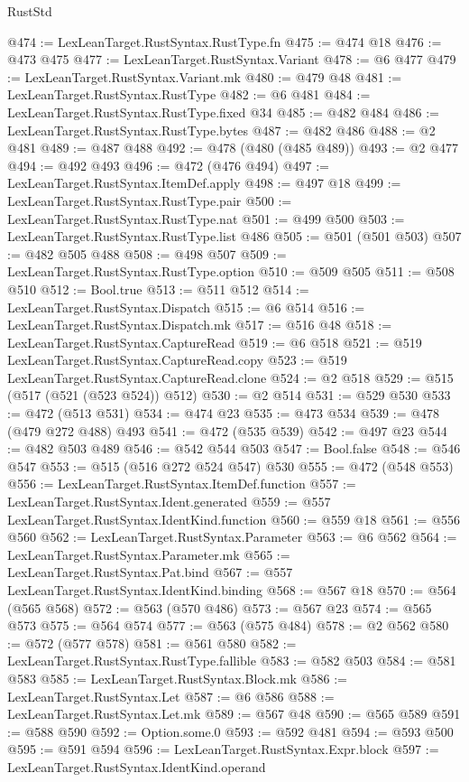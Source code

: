 \begin{lexlean}{RustStd}
\begin{coremodule}
@474 := LexLeanTarget.RustSyntax.RustType.fn
@475 := @474 @18
@476 := @473 @475
@477 := LexLeanTarget.RustSyntax.Variant
@478 := @6 @477
@479 := LexLeanTarget.RustSyntax.Variant.mk
@480 := @479 @48
@481 := LexLeanTarget.RustSyntax.RustType
@482 := @6 @481
@484 := LexLeanTarget.RustSyntax.RustType.fixed @34
@485 := @482 @484
@486 := LexLeanTarget.RustSyntax.RustType.bytes
@487 := @482 @486
@488 := @2 @481
@489 := @487 @488
@492 := @478 (@480 (@485 @489))
@493 := @2 @477
@494 := @492 @493
@496 := @472 (@476 @494)
@497 := LexLeanTarget.RustSyntax.ItemDef.apply
@498 := @497 @18
@499 := LexLeanTarget.RustSyntax.RustType.pair
@500 := LexLeanTarget.RustSyntax.RustType.nat
@501 := @499 @500
@503 := LexLeanTarget.RustSyntax.RustType.list @486
@505 := @501 (@501 @503)
@507 := @482 @505 @488
@508 := @498 @507
@509 := LexLeanTarget.RustSyntax.RustType.option
@510 := @509 @505
@511 := @508 @510
@512 := Bool.true
@513 := @511 @512
@514 := LexLeanTarget.RustSyntax.Dispatch
@515 := @6 @514
@516 := LexLeanTarget.RustSyntax.Dispatch.mk
@517 := @516 @48
@518 := LexLeanTarget.RustSyntax.CaptureRead
@519 := @6 @518
@521 := @519 LexLeanTarget.RustSyntax.CaptureRead.copy
@523 := @519 LexLeanTarget.RustSyntax.CaptureRead.clone
@524 := @2 @518
@529 := @515 (@517 (@521 (@523 @524)) @512)
@530 := @2 @514
@531 := @529 @530
@533 := @472 (@513 @531)
@534 := @474 @23
@535 := @473 @534
@539 := @478 (@479 @272 @488) @493
@541 := @472 (@535 @539)
@542 := @497 @23
@544 := @482 @503 @489
@546 := @542 @544 @503
@547 := Bool.false
@548 := @546 @547
@553 := @515 (@516 @272 @524 @547) @530
@555 := @472 (@548 @553)
@556 := LexLeanTarget.RustSyntax.ItemDef.function
@557 := LexLeanTarget.RustSyntax.Ident.generated
@559 := @557 LexLeanTarget.RustSyntax.IdentKind.function
@560 := @559 @18
@561 := @556 @560
@562 := LexLeanTarget.RustSyntax.Parameter
@563 := @6 @562
@564 := LexLeanTarget.RustSyntax.Parameter.mk
@565 := LexLeanTarget.RustSyntax.Pat.bind
@567 := @557 LexLeanTarget.RustSyntax.IdentKind.binding
@568 := @567 @18
@570 := @564 (@565 @568)
@572 := @563 (@570 @486)
@573 := @567 @23
@574 := @565 @573
@575 := @564 @574
@577 := @563 (@575 @484)
@578 := @2 @562
@580 := @572 (@577 @578)
@581 := @561 @580
@582 := LexLeanTarget.RustSyntax.RustType.fallible
@583 := @582 @503
@584 := @581 @583
@585 := LexLeanTarget.RustSyntax.Block.mk
@586 := LexLeanTarget.RustSyntax.Let
@587 := @6 @586
@588 := LexLeanTarget.RustSyntax.Let.mk
@589 := @567 @48
@590 := @565 @589
@591 := @588 @590
@592 := Option.some.{0}
@593 := @592 @481
@594 := @593 @500
@595 := @591 @594
@596 := LexLeanTarget.RustSyntax.Expr.block
@597 := LexLeanTarget.RustSyntax.IdentKind.operand

\end{coremodule}
\end{lexlean}
